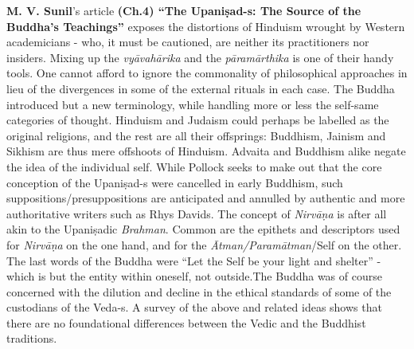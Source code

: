 \textbf{M. V. Sunil}'s article \textbf{(Ch.4) “The Upaniṣad-s: The Source of the Buddha’s Teachings”} exposes the distortions of Hinduism wrought by Western academicians - who, it must be cautioned, are neither its practitioners nor insiders. Mixing up the \textit{vyāvahārika} and the \textit{pāramārthika} is one of their handy tools. One cannot afford to ignore the commonality of philosophical approaches in lieu of the divergences in some of the external rituals in each case. The Buddha introduced but a new terminology, while handling more or less the self-same categories of thought. Hinduism and Judaism could perhaps be labelled as the original religions, and the rest are all their offsprings: Buddhism, Jainism and Sikhism are thus mere offshoots of Hinduism. Advaita and Buddhism alike negate the idea of the individual self. While Pollock seeks to make out that the core conception of the Upaniṣad-s were cancelled in early Buddhism, such suppositions/presuppositions are anticipated and annulled by authentic and more authoritative writers such as Rhys Davids. The concept of \textit{Nirvāṇa} is after all akin to the Upaniṣadic \textit{Brahman}. Common are the epithets and descriptors used for \textit{Nirvāṇa} on the one hand, and for the \textit{Ātman/Paramātman}/Self on the other. The last words of the Buddha were “Let the Self be your light and shelter” - which is but the entity within oneself, not outside.The Buddha was of course concerned with the dilution and decline in the ethical standards of some of the custodians of the Veda-s. A survey of the above and related ideas shows that there are no foundational differences between the Vedic and the Buddhist traditions.

